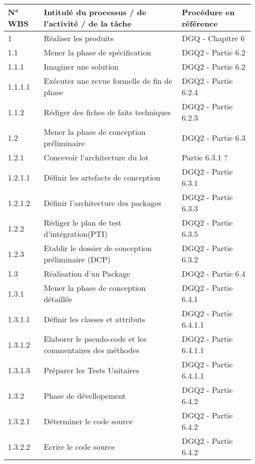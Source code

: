 	
\begin{center}
\begin{tabular}[h]{|p{}|p{}|p{}|}
	\hline
	\rowcolor[gray]{0.65}\textbf{N° WBS} & \textbf{Intitulé du processus / de l'activité / de la tâche} & \textbf{Procédure en référence}\\
	\hline	

        1 & Réaliser les produits & DGQ - Chapitre 6 \\\hline
        1.1 & Mener la phase de spécification & DGQ2 - Partie 6.2 \\\hline
        1.1.1 & Imaginer une solution & DGQ2 - Partie 6.2 \\\hline
        1.1.1.1 & Exécuter une revue formelle de fin de phase & DGQ2 - 		Partie 6.2.4 \\\hline
        1.1.2 & Rédiger des fiches de faits techniques & DGQ2 - Partie 6.2.3 \\\hline
        1.2 & Mener la phase de conception préliminaire & DGQ2 - Partie 6.3 \\\hline
        1.2.1 & Concevoir l'architecture du lot &  Partie 6.3.1 ? \\\hline
        1.2.1.1 & Définir les artefacts de conception & DGQ2 - Partie 6.3.1 \\\hline
        1.2.1.2 & Définir l'architecture des packages & DGQ2 - Partie 6.3.3 \\\hline
        1.2.2 & Rédiger le plan de test d'intégration(PTI) & DGQ2 - Partie 6.3.5\\\hline
        1.2.3 & Etablir le dossier de conception préliminaire (DCP) & DGQ2 -  Partie 6.3.2 \\\hline
        1.3 & Réalisation d'un Package & DGQ2 - Partie 6.4 \\\hline
        1.3.1 & Mener la phase de conception détaillée & DGQ2 - Partie 6.4.1\\\hline
        1.3.1.1 & Définir les classes et attributs & DGQ2 - Partie 6.4.1.1\\\hline
        1.3.1.2 & Elaborer le pseudo-code et les commentaires des méthodes & DGQ2 - Partie 6.4.1.1\\\hline
        1.3.1.3 & Préparer les Tests Unitaires & DGQ2 - Partie 6.4.1.1 \\\hline
        1.3.2 & Phase de dévellopement & DGQ2 - Partie 6.4.2 \\\hline
        1.3.2.1 & Déterminer le code source & DGQ2 - Partie 6.4.2 \\\hline
        1.3.2.2 & Ecrire le code source & DGQ2 - Partie 6.4.2 \\\hline

\end{tabular}
\end{center}
